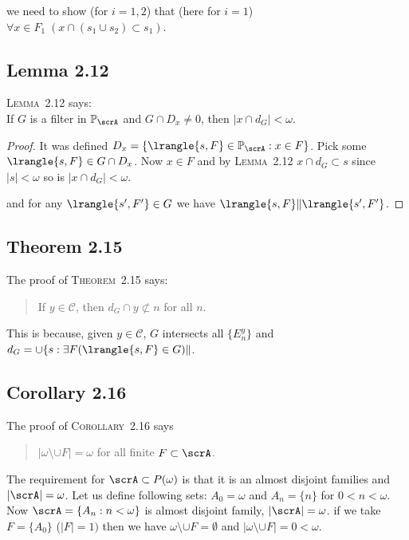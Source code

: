 we need to show (for \(i=1,2\)) that (here for \(i=1\))
\(\forall x \in F_1\;(x\cap (s_1\cup s_2) \subset s_1)\).

\subsection{Lemma 2.12}

\textsc{Lemma}~2.12 says:\\
If $G$ is a filter in \(\mathbb{P}_\scrA\) and 
\(G\cap D_x\neq 0\), then \(|x\cap d_G|< \omega\).
\begin{proof}
It was defined \(D_x = \{\lrangle{s,F}\in\mathbb{P}_\scrA: x\in F\}\).
Pick some \(\lrangle{s,F}\in G\cap D_x\).
Now \(x\in F\) and by \textsc{Lemma}~2.12 \(x\cap d_G \subset s\)
since \(|s|<\omega\) so is \(|x\cap d_G|<\omega\).


and for any \(\lrangle{s',F'}\in G\)
we have \(\lrangle{s,F}\|\lrangle{s',F'}\).
\end{proof}

\subsection{Theorem 2.15}

The proof of \textsc{Theorem}~2.15 says:
\begin{quote}
If \(y\in \mathscr{C}\), then \(d_G \cap y \not\subset n\) for all $n$.
\end{quote}
This is because, given \(y\in\mathscr{C}\), $G$ intersects
all \(\{E_n^y\}\) and \(d_G = \cup\{s: \exists F(\lrangle{s,F}\in G)\|\).

\subsection{Corollary 2.16}

The proof of \textsc{Corollary}~2.16 says
\begin{quote}
 \(|\omega \setminus \cup F|=\omega\) for all finite \(F\subset \scrA\).
\end{quote}
The requirement for \(\scrA\subset P(\omega)\) is that 
it is an almost disjoint families and \(|\scrA|=\omega\).
Let us define following sets:
\(A_0=\omega\) and \(A_n = \{n\}\) for \(0 < n < \omega\).
Now \(\scrA = \{A_n: n < \omega\}\) is almost disjoint family, 
\(|\scrA| = \omega\).
 if we take \(F=\{A_0\}\) (\(|F|=1)\)
then we have \(\omega \setminus \cup F = \emptyset\)
and \(|\omega \setminus \cup F| = 0 < \omega\).

